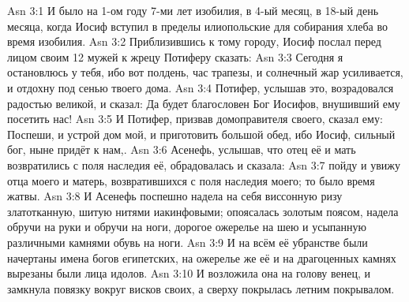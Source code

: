 \vs Asn 3:1
И было на 1-ом году 7-ми лет изобилия,
в 4-ый месяц, в 18-ый день месяца,
когда Иосиф вступил в пределы илиопольские
для собирания хлеба во время изобилия.
\vs Asn 3:2
Приблизившись к тому городу,
Иосиф послал перед лицом своим 12 мужей к жрецу Потиферу сказать:
\vs Asn 3:3
Сегодня я остановлюсь у тебя,
ибо вот полдень, час трапезы,
и солнечный жар усиливается,
и отдохну под сенью твоего дома.
\vs Asn 3:4
Потифер, услышав это,
возрадовался радостью великой, и сказал:
Да будет благословен Бог Иосифов,
внушивший ему посетить нас!
\vs Asn 3:5
И Потифер, призвав
домоправителя своего, сказал ему:
Поспеши, и устрой дом мой, и приготовить
большой обед, ибо Иосиф, сильный бог, ныне придёт к нам,.
\vs Asn 3:6
Асенефь, услышав, что отец
её и мать возвратились с поля наследия её, обрадовалась и сказала:
\vs Asn 3:7
пойду и увижу отца моего и
матерь, возвратившихся с поля наследия моего; то было время жатвы.
\vs Asn 3:8
И Асенефь поспешно надела на себя виссонную ризу златотканную,
шитую нитями иакинфовыми; опоясалась золотым поясом,
надела обручи на руки и обручи на ноги, дорогое ожерелье на шею и
усыпанную различными камнями обувь на ноги.
\vs Asn 3:9
И на всём её убранстве были начертаны
имена богов египетских, на ожерелье же её и на драгоценных камнях
вырезаны были лица идолов.
\vs Asn 3:10
И возложила она на голову венец,
и замкнула повязку вокруг висков своих,
а сверху покрылась летним покрывалом.

